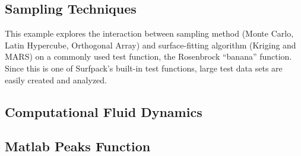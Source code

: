 \documentclass{article}
\begin{document}
\begin{figure}[htbp]
  \centering
  \begin{bigbox}
	\begin{small}
	
 	\end{small}
  \end{bigbox}
   \label{fig:topology}
\end{figure}

\pagebreak
\subsection {Sampling Techniques}

This example explores the interaction between sampling method (Monte Carlo, Latin Hypercube, Orthogonal Array) and surface-fitting algorithm (Kriging and MARS) on a commonly used test function, the Rosenbrock ``banana'' function.  Since this is one of Surfpack's built-in test functions, large test data sets are easily created and analyzed.

\begin{figure}[htbp]
  \centering
  \begin{bigbox}
	\begin{small}
	
 	\end{small}
  \end{bigbox}
   \label{fig:sampling}
\end{figure}

\pagebreak
\subsection {Computational Fluid Dynamics}

\begin{figure}[htbp]
  \centering
  \begin{bigbox}
	\begin{small}
	
 	\end{small}
  \end{bigbox}
   \label{fig:cfd}
\end{figure}

\pagebreak
\subsection {Matlab Peaks Function}

\begin{figure}[htbp]
  \centering
  \begin{bigbox}
	\begin{small}
	
 	\end{small}
  \end{bigbox}
   \label{fig:peaks}
\end{figure}
\end{document}
